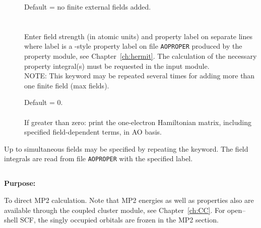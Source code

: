 \begin{description}
\item[]
  Default = no finite external fields added. \\
   \\
   \\
  Enter field strength (in atomic units) and property label on separate lines
  where label is a \molecule-style property label on file \verb|AOPROPER|
  produced by the property module, see Chapter~\ref{ch:hermit}.
  The calculation of the necessary property integral(s) must be requested
  in the  input module. \\
  NOTE: This keyword may be repeated several times for adding more than
  one finite field (max \mxfelt fields).

\item[]
  Default = 0.\\
   \\
  If greater than zero:
  print the one-electron Hamiltonian matrix, including
  specified field-dependent terms, in AO basis.
\end{description}


Up to \mxfelt simultaneous fields may be specified by repeating the
 keyword.
The field integrals are read from file \verb|AOPROPER| with the specified label.

\pagebreak[3]
\subsection{\label{ref-mp2inp}}

{\bf Purpose:}

To direct MP2 calculation. Note that MP2 energies as well as
properties also are available through the coupled cluster module, see
Chapter~\ref{ch:CC}.
For open--shell SCF, the singly occupied orbitals are frozen in the MP2 section.

